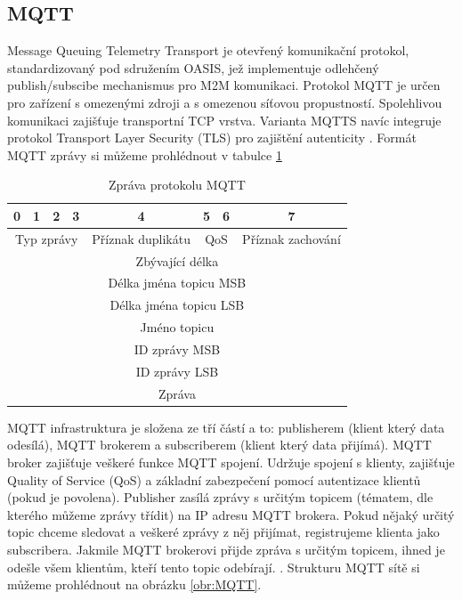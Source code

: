 \subsection{MQTT}
\par Message Queuing Telemetry Transport je otevřený komunikační protokol, standardizovaný pod sdružením OASIS, jež implementuje odlehčený publish/subscibe mechanismus pro M2M komunikaci. Protokol MQTT je určen pro zařízení s omezenými zdroji a s omezenou síťovou propustností. Spolehlivou komunikaci zajišťuje transportní TCP vrstva. Varianta MQTTS navíc integruje protokol Transport Layer Security (TLS) pro zajištění autenticity \cite{Xy18NbcqliC08Kok, Stusek2019, Banks2014}. Formát MQTT zprávy si můžeme prohlédnout v tabulce \ref{table:MQTT} 

    \begin{table}[!h]
    \caption[MQTT zpráva]{Zpráva protokolu MQTT}
    \label{table:MQTT}
    \begin{center}
    \begin{tabular}{|cccccccc|}
    \hline
    \multicolumn{1}{|c|}{0} & \multicolumn{1}{c|}{1} & \multicolumn{1}{c|}{2} & \multicolumn{1}{c|}{3} & \multicolumn{1}{c|}{4} & \multicolumn{1}{c|}{5} & \multicolumn{1}{c|}{6} & 7 \\
    \hline
    \multicolumn{4}{|c|}{Typ zprávy} & \multicolumn{1}{c|}{Příznak duplikátu} & \multicolumn{2}{c|}{QoS} & Příznak zachování \\
    \hline
    \multicolumn{8}{|c|}{Zbývající délka} \\
    \hline
    \multicolumn{8}{|c|}{Délka jména topicu MSB} \\
    \hline
    \multicolumn{8}{|c|}{Délka jména topicu LSB} \\
    \hline
    \multicolumn{8}{|c|}{Jméno topicu} \\
    \hline
    \multicolumn{8}{|c|}{ID zprávy MSB} \\
    \hline
    \multicolumn{8}{|c|}{ID zprávy LSB} \\
    \hline
    \multicolumn{8}{|c|}{Zpráva} \\
    \hline
    \end{tabular}
    \end{center}
    \end{table}

\par MQTT infrastruktura je složena ze tří částí a to: publisherem (klient který data odesílá), MQTT brokerem a subscriberem (klient který data přijímá). MQTT broker zajišťuje veškeré funkce MQTT spojení. Udržuje spojení s klienty, zajišťuje Quality of Service (QoS) a základní zabezpečení pomocí autentizace klientů (pokud je povolena). Publisher zasílá zprávy s určitým topicem (tématem, dle kterého můžeme zprávy třídit) na IP adresu MQTT brokera. Pokud nějaký určitý topic chceme sledovat a veškeré zprávy z něj přijímat, registrujeme klienta jako subscribera. Jakmile MQTT brokerovi přijde zpráva s určitým topicem, ihned je odešle všem klientům, kteří tento topic odebírají. \cite{GillisJanuary2021, Stusek2019}. Strukturu MQTT sítě si můžeme prohlédnout na obrázku \ref{obr:MQTT}.

